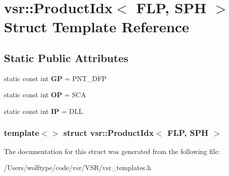 \hypertarget{structvsr_1_1_product_idx_3_01_f_l_p_00_01_s_p_h_01_4}{\section{vsr\-:\-:Product\-Idx$<$ F\-L\-P, S\-P\-H $>$ Struct Template Reference}
\label{structvsr_1_1_product_idx_3_01_f_l_p_00_01_s_p_h_01_4}
}
\subsection*{Static Public Attributes}
\begin{DoxyCompactItemize}
\item 
\hypertarget{structvsr_1_1_product_idx_3_01_f_l_p_00_01_s_p_h_01_4_a6ee1c440a363b3efc7bdac22b39ebd4a}{static const int {\bfseries G\-P} = P\-N\-T\-\_\-\-D\-F\-P}\label{structvsr_1_1_product_idx_3_01_f_l_p_00_01_s_p_h_01_4_a6ee1c440a363b3efc7bdac22b39ebd4a}

\item 
\hypertarget{structvsr_1_1_product_idx_3_01_f_l_p_00_01_s_p_h_01_4_afc4ccba0568520e4731867e60145ad9b}{static const int {\bfseries O\-P} = S\-C\-A}\label{structvsr_1_1_product_idx_3_01_f_l_p_00_01_s_p_h_01_4_afc4ccba0568520e4731867e60145ad9b}

\item 
\hypertarget{structvsr_1_1_product_idx_3_01_f_l_p_00_01_s_p_h_01_4_a409a79fd7f509db159273e954dcae318}{static const int {\bfseries I\-P} = D\-L\-L}\label{structvsr_1_1_product_idx_3_01_f_l_p_00_01_s_p_h_01_4_a409a79fd7f509db159273e954dcae318}

\end{DoxyCompactItemize}
\subsubsection*{template$<$$>$ struct vsr\-::\-Product\-Idx$<$ F\-L\-P, S\-P\-H $>$}



The documentation for this struct was generated from the following file\-:\begin{DoxyCompactItemize}
\item 
/\-Users/wolftype/code/vsr/\-V\-S\-R/vsr\-\_\-templates.\-h\end{DoxyCompactItemize}
